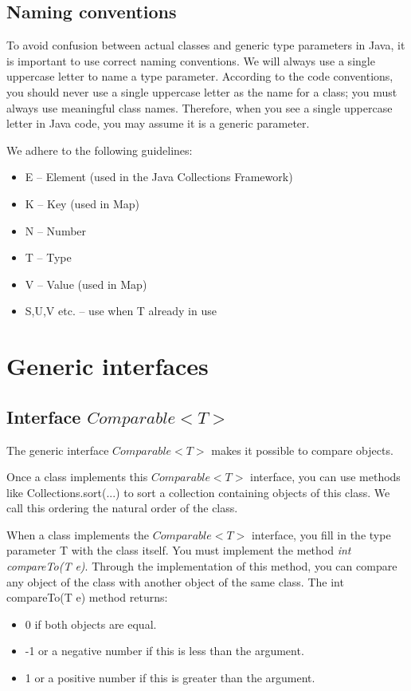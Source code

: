 \subsection{Naming conventions}

To avoid confusion between actual classes and generic type parameters in Java, it is important to use correct naming conventions. We will always use a single uppercase letter to name a type parameter.   According to the code conventions, you should never use a single uppercase letter as the name for a class; you must always use meaningful class names. Therefore, when you see a single uppercase letter in Java code, you may assume it is a generic parameter.

We adhere to the following guidelines:

\begin{itemize}
\item E – Element (used in the Java Collections Framework)
\item K – Key (used in Map)
\item N – Number
\item T – Type
\item V – Value (used in Map)
\item S,U,V etc. – use when T already in use
\end{itemize}

\section{Generic interfaces}

\subsection{Interface $Comparable<T>$}

The generic interface $Comparable<T>$ makes it possible to compare objects. 

Once a class implements this $Comparable<T>$ interface, you can use methods like Collections.sort(...) to sort a collection containing objects of this class. We call this ordering the natural order of the class.

When a class implements the $Comparable<T>$ interface, you fill in the type parameter T with the class itself. You must implement the method \textit{int compareTo(T e)}. Through the implementation of this method, you can compare any object of the class with another object of the same class. The int compareTo(T e) method returns:
\begin{itemize}
\item 0 if both objects are equal.
\item -1 or a negative number if this is less than the argument.
\item 1 or a positive number if this is greater than the argument.
\end{itemize}

